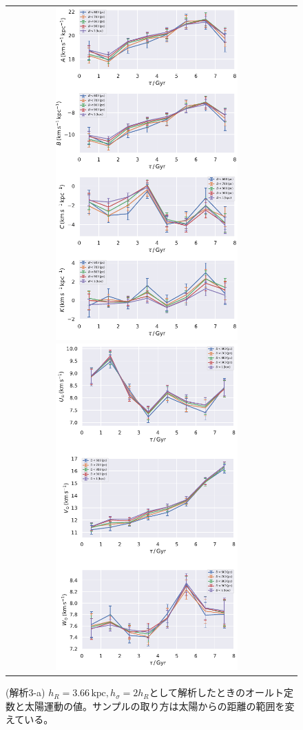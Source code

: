 
\begin{figure}[htbp]
   \centering
\begin{tabular}{cc}
\includegraphics[width=7cm]{fig/ABCK_3a.pdf}
\includegraphics[width=7cm]{fig/UVW_3a.pdf}
\end{tabular}
    \caption{(解析3-a) $h_R=3.66\,\mathrm{kpc}, h_{\sigma}=2h_R$として解析したときのオールト定数と太陽運動の値。サンプルの取り方は太陽からの距離の範囲を変えている。}
    \label{figObs3a}
\end{figure}

